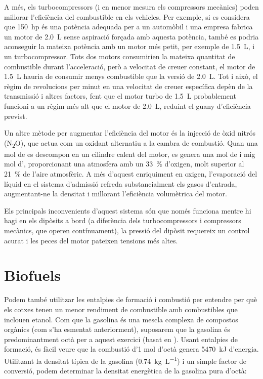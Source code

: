 A més, els turbocompressors (i en menor mesura els compressors mecànics) poden millorar l'eficiència del combustible en els vehicles. Per exemple, si es considera que \qty{150}{hp} és una potència adequada per a un automòbil i una empresa fabrica un motor de \qty{2.0}{L} sense aspiració forçada amb aquesta potència, també es podria aconseguir la mateixa potència amb un motor més petit, per exemple de \qty{1.5}{L}, i un turbocompressor. Tots dos motors consumirien la mateixa quantitat de combustible durant l'acceleració, però a velocitat de creuer constant, el motor de \qty{1.5}{L} hauria de consumir menys combustible que la versió de \qty{2.0}{L}. Tot i això, el règim de revolucions per minut en una velocitat de creuer específica depèn de la transmissió i altres factors, fent que el motor turbo de \qty{1.5}{L} probablement funcioni a un règim més alt que el motor de \qty{2.0}{L}, reduint el guany d'eficiència previst.

\begin{mybox}[title=Injecció d'òxid nitrós]
    Un altre mètode per augmentar l'eficiència del motor és la injecció de òxid nitrós (N\textsubscript{2}O), que actua com un oxidant alternatiu a la cambra de combustió. Quan una mol de  es descompon en un cilindre calent del motor, es genera una mol de  i mig mol d', proporcionant una atmosfera amb un \qty{33}{\percent} d'oxigen, molt superior al \qty{21}{\percent} de l'aire atmosfèric. A més d'aquest enriquiment en oxigen, l'evaporació del  líquid en el sistema d'admissió refreda substancialment els gasos d'entrada, augmentant-ne la densitat i millorant l'eficiència volumètrica del motor.

Els principals inconvenients d'aquest sistema són que només funciona mentre hi hagi  en els dipòsits a bord (a diferència dels turbocompressors i compressors mecànics, que operen contínuament), la pressió del dipòsit requereix un control acurat i les peces del motor pateixen tensions més altes\cite{bowers_understanding_2014}.
\end{mybox}

\section{Biofuels}

Podem també utilitzar les entalpies de formació i combustió per entendre per què els cotxes tenen un menor rendiment de combustible amb combustibles que inclouen etanol. Com que la gasolina és una mescla complexa de compostos orgànics (com s'ha esmentat anteriorment), suposarem que la gasolina és predominantment octà per a aquest exercici (basat en \cite{bowers_understanding_2014}). Usant entalpies de formació, és fàcil veure que la combustió d'1 mol d'octà genera \qty{5470}{\kilo\joule} d'energia. Utilitzant la densitat típica de la gasolina (\qty{0.74}{\kilo\gram\per\liter}) i un simple factor de conversió, podem determinar la densitat energètica de la gasolina pura d'octà:
 

